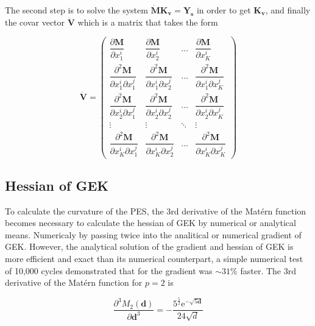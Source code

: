 \documentclass[aps,prb,twocolumn,superscriptaddress,floatfix,longbibliography,10pt]{revtex4-2}
\begin{document}
The second step is to solve the system $\mathbf{\dot M K_v} = \mathbf{Y_s}$ in order to get $\mathbf{K_v}$, and finally the covar vector $\mathbf{\ddot V}$ which is a matrix that takes the form 

\begin{equation} \label{eqn:ddV}
\mathbf{\ddot V} = 
\begin{pmatrix}
\dfrac{\partial\mathbf{M}}{\partial x_1^i}  & \dfrac{\partial\mathbf{M}}{\partial x_2^i} & \dots  & \dfrac{\partial\mathbf{M}}{\partial x_K^i} \\
\dfrac{\partial^2\mathbf{M}}{\partial x_1^i\partial x_1^j}  & \dfrac{\partial^2\mathbf{M}}{\partial x_1^i\partial x_2^j} & \dots  & \dfrac{\partial^2\mathbf{M}}{\partial x_1^i\partial x_K^j} \\
\dfrac{\partial^2\mathbf{M}}{\partial x_2^i\partial x_1^j}  & \dfrac{\partial^2\mathbf{M}}{\partial x_2^i\partial x_2^j} & \dots  & \dfrac{\partial^2\mathbf{M}}{\partial x_2^i\partial x_K^j} \\
\vdots & \vdots & \ddots & \vdots \\
\dfrac{\partial^2\mathbf{M}}{\partial x_K^i\partial x_1^j}  & \dfrac{\partial^2\mathbf{M}}{\partial x_K^i\partial x_2^j} & \dots  & \dfrac{\partial^2\mathbf{M}}{\partial x_K^i\partial x_K^j}
\end{pmatrix}
\end{equation}

\subsection{Hessian of GEK}

To calculate the curvature of the PES, the 3rd derivative of the Mat\'ern function becomes necessary to calculate the hessian of GEK by numerical or analytical means. Numericaly by passing twice into the analitical or numerical gradient of GEK. However, the analytical solution of the gradient and hessian of GEK is more efficient and exact than its numerical counterpart, a simple numerical test of 10,000 cycles demonstrated that for the gradient was $\sim 31\%$ faster. The 3rd derivative of the Mat\'ern function for $p = 2$ is

\begin{equation} \label{eqn:d3mat2p}
\dfrac{\partial^3 M_2(\mathbf{d})}{\partial \mathbf{d}^3} = -\dfrac{5^\frac{5}{2}\mathrm{e}^{-\sqrt{5\mathbf{d}}}}{24\sqrt{d}}
\end{equation}
\end{document}
